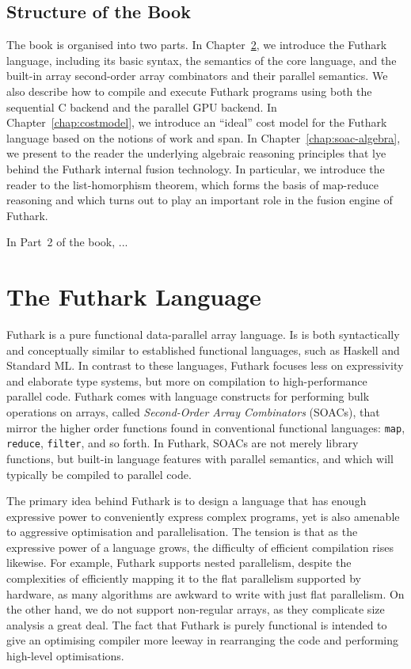 \documentclass[oneside,11pt]{book}
\begin{document}
\section{Structure of the Book}

The book is organised into two parts. In Chapter~\ref{chap:futlang}, we
introduce the Futhark language, including its basic syntax, the
semantics of the core language, and the built-in array second-order
array combinators and their parallel semantics. We also describe how
to compile and execute Futhark programs using both the sequential C
backend and the parallel GPU backend. In Chapter~\ref{chap:costmodel}, we introduce
an ``ideal'' cost model for the Futhark language based on the notions
of work and span. In Chapter~\ref{chap:soac-algebra}, we present to
the reader the underlying algebraic reasoning principles that lye
behind the Futhark internal fusion technology. In particular, we
introduce the reader to the list-homorphism theorem, which forms the
basis of map-reduce reasoning and which turns out to play an important
role in the fusion engine of Futhark.

In Part~2 of the book, ...

\chapter{The Futhark Language}
\label{chap:futlang}
Futhark is a pure functional data-parallel array language.  Is is both
syntactically and conceptually similar to established functional
languages, such as Haskell and Standard ML.  In contrast to these
languages, Futhark focuses less on expressivity and elaborate type
systems, but more on compilation to high-performance parallel code.
Futhark comes with language constructs for performing bulk operations
on arrays, called \textit{Second-Order Array Combinators} (SOACs),
that mirror the higher order functions found in conventional
functional languages: \texttt{map}, \texttt{reduce}, \texttt{filter},
and so forth.  In Futhark, SOACs are not merely library functions, but
built-in language features with parallel semantics, and which will
typically be compiled to parallel code.

The primary idea behind Futhark is to design a language that has
enough expressive power to conveniently express complex programs, yet
is also amenable to aggressive optimisation and parallelisation.  The
tension is that as the expressive power of a language grows, the
difficulty of efficient compilation rises likewise.  For example,
Futhark supports nested parallelism, despite the complexities of
efficiently mapping it to the flat parallelism supported by hardware,
as many algorithms are awkward to write with just flat parallelism.
On the other hand, we do not support non-regular arrays, as they
complicate size analysis a great deal.  The fact that Futhark is
purely functional is intended to give an optimising compiler more
leeway in rearranging the code and performing high-level
optimisations.
\end{document}
